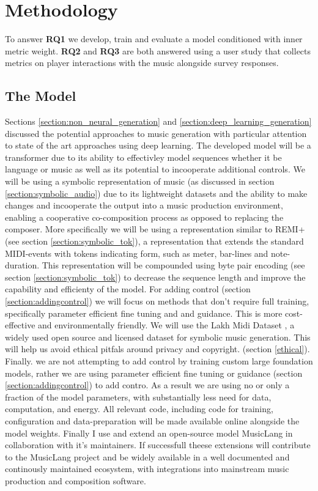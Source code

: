 
\chapter{Methodology}
To answer \textbf{RQ1} we develop, train and evaluate a model conditioned with inner metric weight. \textbf{RQ2} and \textbf{RQ3} are both answered using a user study that collects metrics on player interactions with the music alongside survey responses. 

\section{The Model}
Sections \ref{section:non_neural_generation} and \ref{section:deep_learning_generation} discussed the potential approaches to music generation with particular attention to state of the art approaches using deep learning. The developed model will be a transformer due to its ability to effectivley model sequences whether it be language or music as well as its potential to incooperate additional controls. We will be using a symbolic representation of music (as discussed in section \ref{section:symbolic_audio}) due to its lightweight datasets and the ability to make changes and incooperate the output into a music production environment, enabling a cooperative co-composition process as opposed to replacing the composer. More specifically we will be using a representation similar to REMI+ (see section \ref{section:symbolic_tok}), a representation that extends the standard MIDI-events with tokens indicating form, such as meter, bar-lines and note-duration. This representation will be compounded using byte pair encoding (see section \ref{section:symbolic_tok}) to decrease the sequence length and improve the capability and efficienty of the model. For adding control (section \ref{section:addingcontrol}) we will focus on methods that don't require full training, specifically parameter efficient fine tuning and and guidance. This is more cost-effective and environmentally friendly. We will use the Lakh Midi Dataset \cite{Raffel_2016}, a widely used open source and licensed dataset for symbolic music generation. This will help us avoid ethical pitfals around privacy and copyright. (section \ref{ethical}). Finally. we are not attempting to add control by training custom large foundation models, rather we are using parameter efficient fine tuning or guidance (section \ref{section:addingcontrol}) to add contro. As a result we are using no or only a fraction of the model parameters, with substantially less need for data, computation, and energy. All relevant code, including code for training, configuration and data-preparation will be made available online alongside the model weights. Finally I use and extend an open-source model MusicLang in collaboration with it's maintainers. If successfull theese extensions will contribute to the MusicLang project and be widely available in a well documented and continously maintained ecosystem, with integrations into mainstream music production and composition software. 

